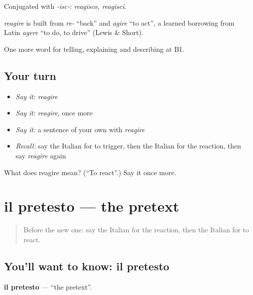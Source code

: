 Conjugated with \emph{-isc-}: \emph{reagisco, reagisci}.

\begin{cousinweb}
\emph{reagire} is built from \emph{re-} \textquotedblleft{}back\textquotedblright{} and \emph{agire} \textquotedblleft{}to act\textquotedblright{}, a learned borrowing from Latin \emph{agere} \textquotedblleft{}to do, to drive\textquotedblright{} (Lewis \& Short).
\end{cousinweb}

\begin{grammarlens}[title={What you've built}]
One more word for telling, explaining and describing at B1.
\end{grammarlens}

\subsection*{Your turn}
\begin{itemize}
\raggedright
  \item \emph{Say it:} \emph{reagire}
  \item \emph{Say it:} \emph{reagire}, once more
  \item \emph{Say it:} a sentence of your own with \emph{reagire}
  \item \emph{Recall:} say the Italian for to trigger, then the Italian for the reaction, then say \emph{reagire} again
\end{itemize}

\begin{tcolorbox}[breakable,colback=teal!4,colframe=teal!35!black,title={Before you move on}]
What does reagire mean? (\textquotedblleft{}To react\textquotedblright{}.) Say it once more.
\end{tcolorbox}
\section[il pretesto]{il pretesto — the pretext}

\label{lesson:IT-C353-pretesto}



\begin{quote}
Before the new one: say the Italian for the reaction, then the Italian for to react.
\end{quote}

\subsection*{You'll want to know: il pretesto}
\textbf{il pretesto} — \textquotedblleft{}the pretext\textquotedblright{}.


